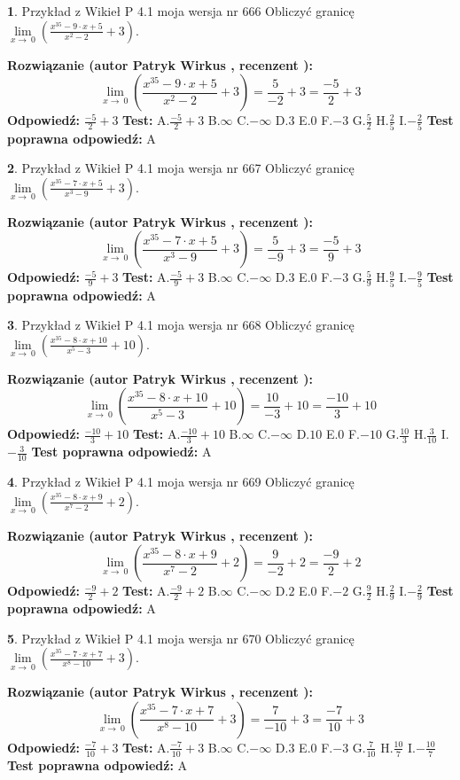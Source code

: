 \documentclass[12pt, a4paper]{article}
\theoremstyle{definition} %
\newtheorem{zad}{}
\newcommand{\zadStart}[1]{\begin{zad}#1\newline}
\newcommand{\zadStop}{\end{zad}}
\newcommand{\rozwStart}[2]{\noindent \textbf{Rozwiązanie (autor #1 , recenzent #2): }\newline}
\newcommand{\rozwStop}{\newline}
\newcommand{\odpStart}{\noindent \textbf{Odpowiedź:}\newline}
\newcommand{\odpStop}{\newline}
\newcommand{\testStart}{\noindent \textbf{Test:}\newline}
\newcommand{\testStop}{\newline}
\newcommand{\kluczStart}{\noindent \textbf{Test poprawna odpowiedź:}\newline}
\newcommand{\kluczStop}{\newline}
\begin{document}
\zadStart{Przykład z Wikieł P 4.1 moja wersja nr 666}
Obliczyć granicę $\lim\limits_{x\to\ 0}(\frac{x^{35}-9 \cdot x +5}{x^{2}-2}+3)$.
\zadStop
\rozwStart{Patryk Wirkus}{}
$$\lim\limits_{x\to\ 0}(\frac{x^{35}-9 \cdot x +5}{x^{2}-2}+3)=\frac{5}{-2}+3=\frac{-5}{2}+3$$
\rozwStop
\odpStart
$\frac{-5}{2}+3$
\odpStop
\testStart
A.$\frac{-5}{2}+3$
B.$\infty$
C.$-\infty$
D.$3$
E.$0$
F.$-3$
G.$\frac{5}{2}$
H.$\frac{2}{5}$
I.$-\frac{2}{5}$
\testStop
\kluczStart
A
\kluczStop



\zadStart{Przykład z Wikieł P 4.1 moja wersja nr 667}
Obliczyć granicę $\lim\limits_{x\to\ 0}(\frac{x^{35}-7 \cdot x +5}{x^{3}-9}+3)$.
\zadStop
\rozwStart{Patryk Wirkus}{}
$$\lim\limits_{x\to\ 0}(\frac{x^{35}-7 \cdot x +5}{x^{3}-9}+3)=\frac{5}{-9}+3=\frac{-5}{9}+3$$
\rozwStop
\odpStart
$\frac{-5}{9}+3$
\odpStop
\testStart
A.$\frac{-5}{9}+3$
B.$\infty$
C.$-\infty$
D.$3$
E.$0$
F.$-3$
G.$\frac{5}{9}$
H.$\frac{9}{5}$
I.$-\frac{9}{5}$
\testStop
\kluczStart
A
\kluczStop



\zadStart{Przykład z Wikieł P 4.1 moja wersja nr 668}
Obliczyć granicę $\lim\limits_{x\to\ 0}(\frac{x^{35}-8 \cdot x +10}{x^{5}-3}+10)$.
\zadStop
\rozwStart{Patryk Wirkus}{}
$$\lim\limits_{x\to\ 0}(\frac{x^{35}-8 \cdot x +10}{x^{5}-3}+10)=\frac{10}{-3}+10=\frac{-10}{3}+10$$
\rozwStop
\odpStart
$\frac{-10}{3}+10$
\odpStop
\testStart
A.$\frac{-10}{3}+10$
B.$\infty$
C.$-\infty$
D.$10$
E.$0$
F.$-10$
G.$\frac{10}{3}$
H.$\frac{3}{10}$
I.$-\frac{3}{10}$
\testStop
\kluczStart
A
\kluczStop



\zadStart{Przykład z Wikieł P 4.1 moja wersja nr 669}
Obliczyć granicę $\lim\limits_{x\to\ 0}(\frac{x^{35}-8 \cdot x +9}{x^{7}-2}+2)$.
\zadStop
\rozwStart{Patryk Wirkus}{}
$$\lim\limits_{x\to\ 0}(\frac{x^{35}-8 \cdot x +9}{x^{7}-2}+2)=\frac{9}{-2}+2=\frac{-9}{2}+2$$
\rozwStop
\odpStart
$\frac{-9}{2}+2$
\odpStop
\testStart
A.$\frac{-9}{2}+2$
B.$\infty$
C.$-\infty$
D.$2$
E.$0$
F.$-2$
G.$\frac{9}{2}$
H.$\frac{2}{9}$
I.$-\frac{2}{9}$
\testStop
\kluczStart
A
\kluczStop



\zadStart{Przykład z Wikieł P 4.1 moja wersja nr 670}
Obliczyć granicę $\lim\limits_{x\to\ 0}(\frac{x^{35}-7 \cdot x +7}{x^{8}-10}+3)$.
\zadStop
\rozwStart{Patryk Wirkus}{}
$$\lim\limits_{x\to\ 0}(\frac{x^{35}-7 \cdot x +7}{x^{8}-10}+3)=\frac{7}{-10}+3=\frac{-7}{10}+3$$
\rozwStop
\odpStart
$\frac{-7}{10}+3$
\odpStop
\testStart
A.$\frac{-7}{10}+3$
B.$\infty$
C.$-\infty$
D.$3$
E.$0$
F.$-3$
G.$\frac{7}{10}$
H.$\frac{10}{7}$
I.$-\frac{10}{7}$
\testStop
\kluczStart
A
\kluczStop
\end{document}
